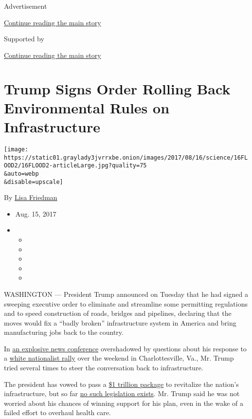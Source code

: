 Advertisement

\protect\hyperlink{after-top}{Continue reading the main story}

Supported by

\protect\hyperlink{after-sponsor}{Continue reading the main story}

\hypertarget{trump-signs-order-rolling-back-environmental-rules-on-infrastructure}{%
\section{Trump Signs Order Rolling Back Environmental Rules on
Infrastructure}\label{trump-signs-order-rolling-back-environmental-rules-on-infrastructure}}

\texttt{[image: https://static01.graylady3jvrrxbe.onion/images/2017/08/16/science/16FLOOD2/16FLOOD2-articleLarge.jpg?quality=75\\\&auto=webp\\\&disable=upscale]}

By \href{https://www.nytimes3xbfgragh.onion/by/lisa-friedman}{Lisa
Friedman}

\begin{itemize}
\item
  Aug. 15, 2017
\item
  \begin{itemize}
  \item
  \item
  \item
  \item
  \item
  \end{itemize}
\end{itemize}

WASHINGTON --- President Trump announced on Tuesday that he had signed a
sweeping executive order to eliminate and streamline some permitting
regulations and to speed construction of roads, bridges and pipelines,
declaring that the moves would fix a ``badly broken'' infrastructure
system in America and bring manufacturing jobs back to the country.

In
\href{https://www.nytimes3xbfgragh.onion/2017/08/15/us/politics/trump-press-conference-charlottesville.html}{an
explosive news conference} overshadowed by questions about his response
to a \href{100000005365230/draft/editing}{white nationalist rally} over
the weekend in Charlottesville, Va., Mr. Trump tried several times to
steer the conversation back to infrastructure.

The president has vowed to pass a
\href{https://www.nytimes3xbfgragh.onion/2017/06/03/us/politics/trump-plans-to-shift-infrastructure-funding-to-cities-states-and-business.html}{\$1
trillion package} to revitalize the nation's infrastructure, but so far
\href{https://www.nytimes3xbfgragh.onion/2017/07/23/us/trump-infrastructure-program.html}{no
such legislation exists}. Mr. Trump said he was not worried about his
chances of winning support for his plan, even in the wake of a failed
effort to overhaul health care.

